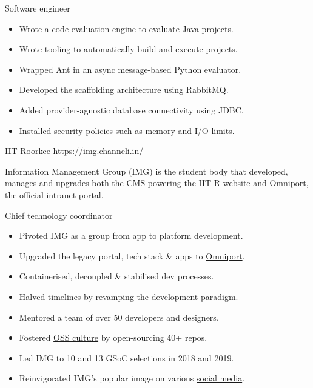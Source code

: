 \rolesubsubsection
  {Software engineer}
  {}

\begin{sectiondescription}
  \begin{itemize}[nosep, leftmargin = *]
    \item Wrote a code-evaluation engine to evaluate Java projects.
    \item Wrote tooling to automatically build and execute projects.
    \item Wrapped Ant in an async message-based Python evaluator.
    \item Developed the scaffolding architecture using RabbitMQ.
    \item Added provider-agnostic database connectivity using JDBC.
    \item Installed security policies such as memory and I/O limits.
  \end{itemize}
\end{sectiondescription}



  {IIT Roorkee}
  {https://img.channeli.in/}

\begin{sectiondescription}
  Information Management Group (IMG) is the student body that developed, manages
  and upgrades both the CMS powering the IIT-R website and Omniport, the
  official intranet portal.
\end{sectiondescription}

\rolesubsubsection
  {Chief technology coordinator}
  {}

\begin{sectiondescription}
  \begin{itemize}[nosep, leftmargin = *]
    \item Pivoted IMG as a group from app to platform development.
    \item Upgraded the legacy portal, tech stack \& apps to \href{https://omniport.readthedocs.io/}{Omniport}.
    \item Containerised, decoupled \& stabilised dev processes.
    \item Halved timelines by revamping the development paradigm.
    \item Mentored a team of over 50 developers and designers.
    \item Fostered \href{https://github.com/IMGIITRoorkee/}{OSS culture} by open-sourcing 40+ repos.
    \item Led IMG to 10 and 13 GSoC selections in 2018 and 2019.
    \item Reinvigorated IMG's popular image on various \href{https://facebook.com/IMGIITRoorkee}{social media}.
  \end{itemize}
\end{sectiondescription}
